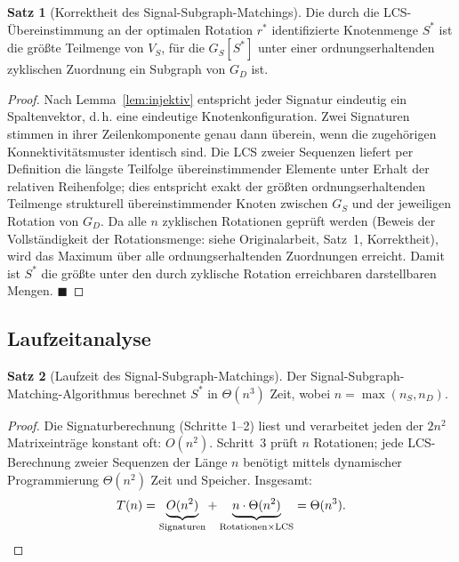 ﻿\documentclass[a4paper,12pt]{article}
\theoremstyle{definition}
\newtheorem{satz}{Satz}
\begin{document}
\begin{satz}[Korrektheit des Signal-Subgraph-Matchings]
\label{satz:korrektheit}
	Die durch die LCS-Übereinstimmung an der optimalen Rotation $r^\ast$ identifizierte Knotenmenge $S^\ast$ ist die größte Teilmenge von $V_S$, für die $G_S[S^\ast]$ unter einer ordnungserhaltenden zyklischen Zuordnung ein Subgraph von $G_D$ ist.
\end{satz}
\begin{proof}
	Nach Lemma~\ref{lem:injektiv} entspricht jeder Signatur eindeutig ein Spaltenvektor, d.\,h. eine eindeutige Knotenkonfiguration. Zwei Signaturen stimmen in ihrer Zeilenkomponente genau dann überein, wenn die zugehörigen Konnektivitätsmuster identisch sind. Die LCS zweier Sequenzen liefert per Definition die längste Teilfolge übereinstimmender Elemente unter Erhalt der relativen Reihenfolge; dies entspricht exakt der größten ordnungserhaltenden Teilmenge strukturell übereinstimmender Knoten zwischen $G_S$ und der jeweiligen Rotation von $G_D$. Da alle $n$ zyklischen Rotationen geprüft werden (Beweis der Vollständigkeit der Rotationsmenge: siehe Originalarbeit, Satz~1, Korrektheit), wird das Maximum über alle ordnungserhaltenden Zuordnungen erreicht. Damit ist $S^\ast$ die größte unter den durch zyklische Rotation erreichbaren darstellbaren Mengen. $\blacksquare$
\end{proof}

\subsection{Laufzeitanalyse}

\begin{satz}[Laufzeit des Signal-Subgraph-Matchings]
\label{satz:laufzeit}
	Der Signal-Subgraph-Matching-Algorithmus berechnet $S^\ast$ in $\Theta(n^3)$ Zeit, wobei $n = \max(n_S, n_D)$.
\end{satz}
\begin{proof}
	Die Signaturberechnung (Schritte 1--2) liest und verarbeitet jeden der $2n^2$ Matrixeinträge konstant oft: $O(n^2)$. Schritt~3 prüft $n$ Rotationen; jede LCS-Berechnung zweier Sequenzen der Länge $n$ benötigt mittels dynamischer Programmierung $\Theta(n^2)$ Zeit und Speicher. Insgesamt:
	\[
	T(n) = \underbrace{O(n^2)}_{\text{Signaturen}} + \underbrace{n \cdot \Theta(n^2)}_{\text{Rotationen} \times \text{LCS}} = \Theta(n^3). \qedhere
	\]
\end{proof}
\end{document}
